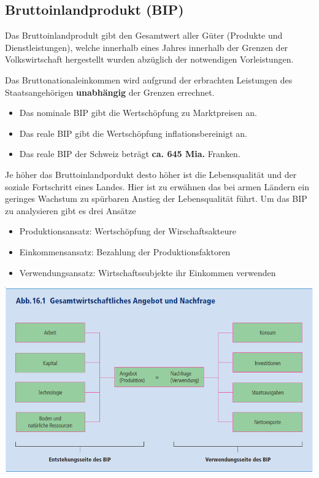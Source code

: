 \subsection{Bruttoinlandprodukt (BIP)}
\begin{center}
    Das Bruttoinlandprodult gibt den Gesamtwert aller Güter (Produkte und Dienstleistungen), welche innerhalb eines Jahres innerhalb der Grenzen der Volkswirtschaft hergestellt wurden abzüglich der notwendigen Vorleistungen.
\end{center}
Das Bruttonationaleinkommen wird aufgrund der erbrachten Leistungen des Staatsangehörigen \textbf{unabhängig} der Grenzen errechnet.
\begin{itemize}
	\item Das nominale BIP gibt die Wertschöpfung zu Marktpreisen an.
	\item Das reale BIP gibt die Wertschöpfung inflationsbereinigt an.
	\item Das reale BIP der Schweiz beträgt \textbf{ca. 645 Mia.} Franken.
\end{itemize}
\vspace{0.5cm}
Je höher das Bruttoinlandpordukt desto höher ist die  Lebensqualität und der soziale Fortschritt eines Landes. Hier ist zu erwähnen das bei armen Ländern ein geringes Wachstum zu spürbaren Anstieg der Lebensqualität führt. Um das BIP zu analysieren gibt es drei Ansätze
\begin{itemize}
	\item Produktionsansatz: Wertschöpfung der Wirschaftsakteure
	\item Einkommensansatz: Bezahlung der Produktionsfaktoren
	\item Verwendungsansatz: Wirtschaftssubjekte ihr Einkommen verwenden
\end{itemize}
\includegraphics[width=0.8\linewidth]{images/bip.png}
\clearpage
\pagebreak